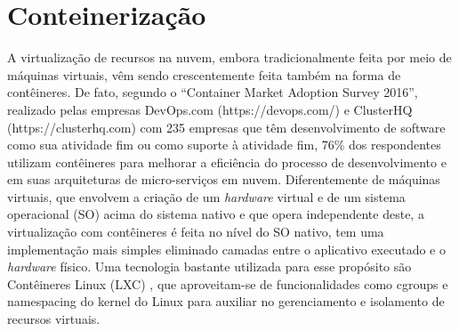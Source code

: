\section{Conteinerização}

A virtualização de recursos na nuvem, embora tradicionalmente feita por meio de máquinas virtuais, vêm sendo crescentemente feita também na forma de contêineres.
%
De fato, segundo o ``Container Market Adoption Survey 2016'', realizado pelas empresas DevOps.com (https://devops.com/) e ClusterHQ (https://clusterhq.com) com 235 empresas que têm desenvolvimento de software como sua atividade fim ou como suporte à atividade fim, 76\% dos respondentes utilizam contêineres para melhorar a eficiência do processo de desenvolvimento e em suas arquiteturas de micro-serviços em nuvem.
%
Diferentemente de máquinas virtuais, que envolvem a criação de um \textit{hardware} virtual e de um sistema operacional (SO) acima do sistema nativo e que opera independente deste, a virtualização com contêineres é feita no nível do SO nativo, tem uma implementação mais simples eliminado camadas entre o aplicativo executado e o \textit{hardware} físico.
%
Uma tecnologia bastante utilizada para esse propósito são Contêineres Linux (LXC) \cite{Linuxcontainers.org2015}, que aproveitam-se de funcionalidades como cgroups e namespacing do kernel do Linux para auxiliar no gerenciamento e isolamento de recursos virtuais.




